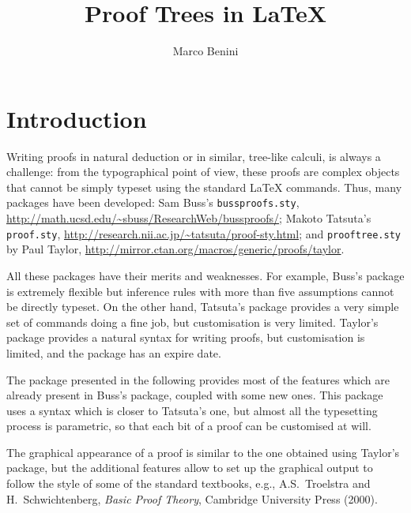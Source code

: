 \documentclass{amsart}
\begin{document}
\title{Proof Trees in \LaTeX}
\date{}
\author{Marco Benini}
\address{Dipartimento di Scienza e Alta Tecnologia\\
  Universit\`a degli Studi dell'Insubria\\
  via Valleggio 11, I-22100 Como, Italy}
\maketitle


\section{Introduction}\label{sec:introduction}
Writing proofs in natural deduction or in similar, tree-like calculi,
is always a challenge: from the typographical point of view, these
proofs are complex objects that cannot be simply typeset using the
standard \LaTeX{} commands. Thus, many packages have been developed:
Sam Buss's \texttt{bussproofs.sty},
\url{http://math.ucsd.edu/~sbuss/ResearchWeb/bussproofs/}; Makoto
Tatsuta's \texttt{proof.sty},
\url{http://research.nii.ac.jp/~tatsuta/proof-sty.html}; and
\texttt{prooftree.sty} by Paul Taylor,
\url{http://mirror.ctan.org/macros/generic/proofs/taylor}.

All these packages have their merits and weaknesses. For example,
Buss's package is extremely flexible but inference rules with more
than five assumptions cannot be directly typeset. On the other hand,
Tatsuta's package provides a very simple set of commands doing a
fine job, but customisation is very limited. Taylor's package provides
a natural syntax for writing proofs, but customisation is limited, and
the package has an expire date.

The package presented in the following provides most of the features
which are already present in Buss's package, coupled with some new
ones. This package uses a syntax which is closer to Tatsuta's one, but
almost all the typesetting process is parametric, so that each bit of
a proof can be customised at will.

The graphical appearance of a proof is similar to the one obtained
using Taylor's package, but the additional features allow to set up
the graphical output to follow the style of some of the standard
textbooks, e.g., A.S.~Troelstra and H.~Schwichtenberg, \textit{Basic
  Proof Theory}, Cambridge University Press (2000).
\end{document}
